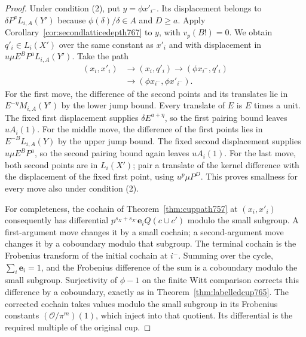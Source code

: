 \documentclass[a4paper,11pt]{article}
\theoremstyle{definition}
\theoremstyle{remark}
\numberwithin{equation}{section}
\begin{document}
\begin{proof}
Under condition (2), put \(y=\phi x'_{i^-}\). Its
displacement belongs to \(\delta P^a L_{i,A}(Y')\)
because \(\phi(\delta)/\delta\in A\) and \(D\ge a\).
Apply Corollary~\ref{cor:secondlatticedepth767} to
\(y\), with \(v_p(B!)=0\). We obtain \(q'_i\in L_i(X')\)
over the same constant as \(x'_i\) and with displacement
in \(u\mu E^B P^a L_{i,A}(Y')\). Take the path
\[
 \begin{aligned}
 (x_i,x'_i)&\longrightarrow(x_i,q'_i)
            \longrightarrow(\phi x_{i^-},q'_i)\\
            &\longrightarrow(\phi x_{i^-},\phi x'_{i^-}).
 \end{aligned}
\]
For the first move, the difference of the second points and
its translates lie in \(E^{-\eta}M_{i,A}(Y')\) by the
lower jump bound. Every translate of \(E\) is \(E\)
times a unit. The fixed first displacement supplies
\(\delta E^{a+\eta}\), so the first pairing bound leaves
\(u A_i(1)\). For the middle move, the difference of the
first points lies in \(E^{-B}L_{i,A}(Y)\) by the upper
jump bound. The fixed second displacement supplies
\(u\mu E^B P^a\), so the second pairing bound again
leaves \(u A_i(1)\). For the last move, both second
points are in \(L_i(X')\); pair a translate of the
kernel difference with the displacement of the fixed
first point, using \(u^p\mu P^D\). This proves smallness
for every move also under condition (2).

For completeness, the cochain of
Theorem~\ref{thm:cuppath757} at \((x_i,x'_i)\) consequently
has differential \(p^{s_X+s_{X'}}\mathbf e_i Q(c\cup c')\)
modulo the small subgroup. A first-argument move changes
it by a small cochain; a second-argument move changes it
by a coboundary modulo that subgroup. The terminal
cochain is the Frobenius transform of the initial cochain
at \(i^-\). Summing over the cycle, \(\sum_i\mathbf e_i=1\),
and the Frobenius difference of the sum is a coboundary
modulo the small subgroup. Surjectivity of \(\phi-1\)
on the finite Witt comparison corrects this difference
by a coboundary, exactly as in
Theorem~\ref{thm:labelledcup765}. The corrected cochain
takes values modulo the small subgroup in its Frobenius
constants \((\mathcal O/\pi^m)(1)\), which inject into
that quotient. Its differential is the required multiple
of the original cup.
\end{proof}
\end{document}
